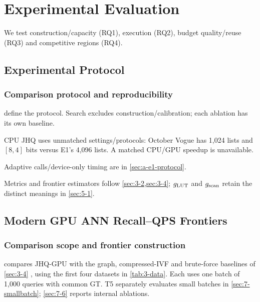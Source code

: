 \chapter{Experimental Evaluation}
\label{ch:evaluation}

We test construction/capacity (RQ1), execution (RQ2), budget quality/reuse (RQ3) and competitive regions (RQ4).

\section{Experimental Protocol}
\label{sec:7-1}

\subsection{Comparison protocol and reproducibility}

 define the protocol. Search excludes construction/calibration; each ablation has its own baseline.

CPU JHQ uses unmatched settings/protocols: October Vogue has 1,024 lists and $[8,4]$ bits versus E1's 4,096 lists. A matched CPU/GPU speedup is unavailable.

Adaptive calls/device-only timing are in \cref{sec:a-e1-protocol}.

Metrics and frontier estimators follow \cref{sec:3-2,sec:3-4};
$g_{\mathrm{LUT}}$ and $g_{\mathrm{scan}}$ retain the distinct meanings in \cref{sec:5-1}.





\section{Modern GPU ANN Recall--QPS Frontiers}
\label{sec:7-2}

\subsection{Comparison scope and frontier construction}

 compares JHQ-GPU with the graph, compressed-IVF
and brute-force baselines of \cref{sec:3-4} \cite{cagra,pq,ivfrabitq},
using the first four datasets in \cref{tab:3-data}. Each uses one batch
of 1,000 queries with common GT. T5 separately evaluates small batches
in \cref{sec:7-smallbatch}; \cref{sec:7-6} reports internal ablations.


